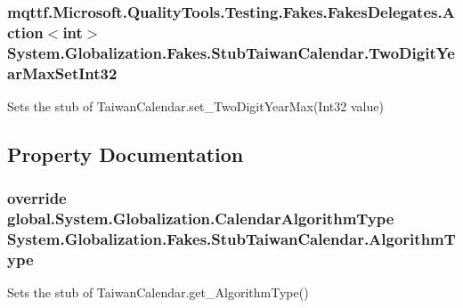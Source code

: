 \hypertarget{class_system_1_1_globalization_1_1_fakes_1_1_stub_taiwan_calendar_a78a53bbcaaf9583a24087baa6027eff4}{
\subsubsection[{Two\-Digit\-Year\-Max\-Set\-Int32}]{\setlength{\rightskip}{0pt plus 5cm}mqttf.\-Microsoft.\-Quality\-Tools.\-Testing.\-Fakes.\-Fakes\-Delegates.\-Action$<$int$>$ System.\-Globalization.\-Fakes.\-Stub\-Taiwan\-Calendar.\-Two\-Digit\-Year\-Max\-Set\-Int32}}\label{class_system_1_1_globalization_1_1_fakes_1_1_stub_taiwan_calendar_a78a53bbcaaf9583a24087baa6027eff4}


Sets the stub of Taiwan\-Calendar.\-set\-\_\-\-Two\-Digit\-Year\-Max(\-Int32 value)



\subsection{Property Documentation}
\hypertarget{class_system_1_1_globalization_1_1_fakes_1_1_stub_taiwan_calendar_a2909bba7a768e86024c4211365fcffe0}{
\subsubsection[{Algorithm\-Type}]{\setlength{\rightskip}{0pt plus 5cm}override global.\-System.\-Globalization.\-Calendar\-Algorithm\-Type System.\-Globalization.\-Fakes.\-Stub\-Taiwan\-Calendar.\-Algorithm\-Type\hspace{0.3cm}{\ttfamily [get]}}}\label{class_system_1_1_globalization_1_1_fakes_1_1_stub_taiwan_calendar_a2909bba7a768e86024c4211365fcffe0}


Sets the stub of Taiwan\-Calendar.\-get\-\_\-\-Algorithm\-Type()

